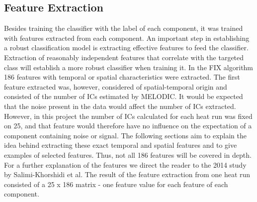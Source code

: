 \subsection{Feature Extraction}
Besides training the classifier with the label of each component, it was trained with features extracted from each component. An important step in establishing a robust classification model is extracting effective features to feed the classifier. Extraction of reasonably independent features that correlate with the targeted class will establish a more robust classifier when training it. In the FIX algorithm 186 features with temporal or spatial characteristics were extracted. The first feature extracted was, however, considered of spatial-temporal origin and consisted of the number of ICs estimated by MELODIC. It would be expected that the noise present in the data would affect the number of ICs extracted. \cite{Salimi-Khorshidi2014} However, in this project the number of ICs calculated for each heat run was fixed on 25, and that feature would therefore have no influence on the expectation of a component containing noise or signal. 
The following sections aim to explain the idea behind extracting these exact temporal and spatial features and to give examples of selected features. Thus, not all 186 features will be covered in depth. For a further explanation of the features we direct the reader to the 2014 study by Salimi-Khorshidi et al. \cite{Salimi-Khorshidi2014} The result of the feature extraction from one heat run consisted of a 25 x 186 matrix - one feature value for each feature of each component.

